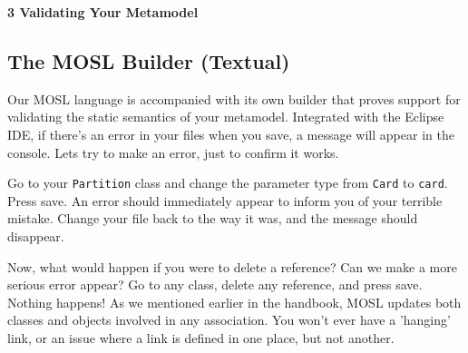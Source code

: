 \newpage
\texHeader

{\bf \Large 3 \hspace{0.5cm}Validating Your Metamodel}

\subsection{ The MOSL Builder (Textual)}

\hypertarget{validation tex}{} Our MOSL language is accompanied with its own builder that proves support for validating the static semantics of your metamodel.
Integrated with the Eclipse IDE, if there's an error in your files when you save, a message will appear in the console. Lets try to make an error, just to
confirm it works.

Go to your \texttt{Partition} class and change the parameter type from \texttt{Card} to \texttt{card}. Press save. An error should immediately appear to inform
you of your terrible mistake. Change your file back to the way it was, and the message should disappear.

Now, what would happen if you were to delete a reference? Can we make a more serious error appear? Go to any class, delete any reference, and press save.
Nothing happens! As we mentioned earlier in the handbook, MOSL updates both classes and objects involved in any association. You won't ever have a 'hanging'
link, or an issue where a link is defined in one place, but not another.

